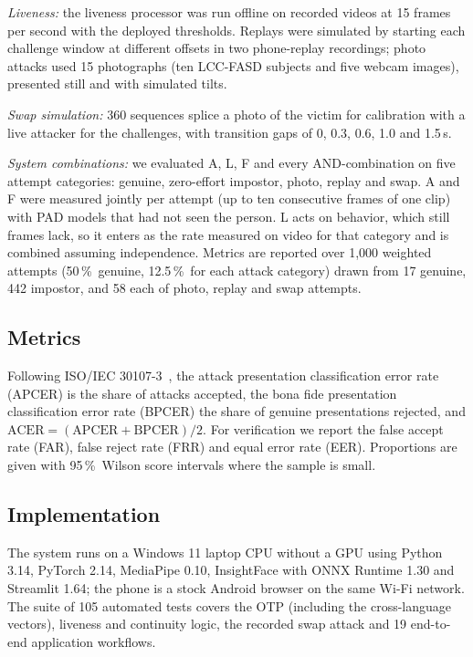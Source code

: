 \documentclass{ieeeaccess}
\newcommand{\pct}{\,\%}
\begin{document}
\emph{Liveness:} the liveness processor was run offline on recorded videos at 15 frames per second with
the deployed thresholds. Replays were simulated by starting each challenge window at different offsets
in two phone-replay recordings; photo attacks used 15 photographs (ten LCC-FASD subjects and five
webcam images), presented still and with simulated tilts.

\emph{Swap simulation:} 360 sequences splice a photo of the victim for calibration with a live attacker
for the challenges, with transition gaps of 0, 0.3, 0.6, 1.0 and 1.5\,s.

\emph{System combinations:} we evaluated A, L, F and every AND-combination on five attempt categories:
genuine, zero-effort impostor, photo, replay and swap. A and F were measured jointly per attempt (up
to ten consecutive frames of one clip) with PAD models that had not seen the person. L acts on behavior,
which still frames lack, so it enters as the rate measured on video for that category and is combined
assuming independence. Metrics are reported over 1,000 weighted attempts (50\pct\ genuine, 12.5\pct\
for each attack category) drawn from 17 genuine, 442 impostor, and 58 each of photo, replay and swap
attempts.

\subsection{Metrics}
Following ISO/IEC 30107-3~\cite{iso30107}, the attack presentation classification error rate (APCER)
is the share of attacks accepted, the bona fide presentation classification error rate (BPCER) the share
of genuine presentations rejected, and $\text{ACER}=(\text{APCER}+\text{BPCER})/2$. For verification
we report the false accept rate (FAR), false reject rate (FRR) and equal error rate (EER). Proportions
are given with 95\pct\ Wilson score intervals where the sample is small.

\subsection{Implementation}
The system runs on a Windows 11 laptop CPU without a GPU  %
using Python 3.14, PyTorch 2.14, MediaPipe 0.10, InsightFace with ONNX Runtime 1.30 and Streamlit
1.64; the phone is a stock Android browser on the same Wi-Fi network. The suite of 105 automated tests
covers the OTP (including the cross-language vectors), liveness and continuity logic, the recorded
swap attack and 19 end-to-end application workflows.
\end{document}
